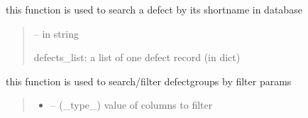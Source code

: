 \documentclass[letterpaper,10pt,english]{sphinxmanual}
\begin{document}
\begin{savenotes}
\begin{fulllineitems}

\begin{savenotes}\begin{fulllineitems}
\label{\detokenize{setting/database_utils:oxin.database_utils.dataBaseUtils.search_defect_by_short_name}}
\pysigstartsignatures
{}
\pysigstopsignatures
\sphinxAtStartPar
this function is used to search a defect by its short\sphinxhyphen{}name in database
\begin{quote}\begin{description}
\sphinxAtStartPar
{} – in string

\sphinxAtStartPar
defects\_list: a list of one defect record (in dict)

\end{description}\end{quote}

\end{fulllineitems}\end{savenotes}


\begin{savenotes}\begin{fulllineitems}
\label{\detokenize{setting/database_utils:oxin.database_utils.dataBaseUtils.search_defect_group_by_filter}}
\pysigstartsignatures
{}
\pysigstopsignatures
\sphinxAtStartPar
this function is used to search/filter defect\sphinxhyphen{}groups by filter params
\begin{quote}\begin{description}
\begin{itemize}
\item {} 
\sphinxAtStartPar
{} – (\_type\_) value of columns to filter


\end{itemize}
\end{description}
\end{quote}
\end{fulllineitems}
\end{savenotes}
\end{fulllineitems}
\end{savenotes}
\end{document}
